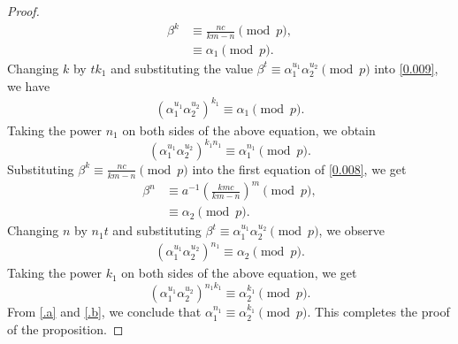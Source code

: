 \documentclass[table]{amsart}
\numberwithin{equation}{section}
\begin{document}
\begin{proof}
		\begin{align}\label{0.009}
			\beta^k &\equiv \frac{nc}{km-n}\pmod{p},\nonumber\\
			&\equiv \alpha_1 \pmod{p}.
		\end{align}
Changing $k$ by $tk_1$ and substituting the value $\beta^t \equiv \alpha_1^{u_1}\alpha_2^{u_2}\pmod {p}$ into \eqref{0.009}, we have
		\begin{align*}
			(\alpha_1^{u_1}\alpha_2^{u_2})^{k_1} \equiv \alpha_1 \pmod{p}.
		\end{align*}
		Taking the power $n_1$ on both sides of the  above equation, we obtain
		\begin{equation}\label{.a}
			(\alpha_1^{u_1}\alpha_2^{u_2})^{k_1n_1} \equiv \alpha_1^{n_1} \pmod{p}.
		\end{equation}
Substituting $\beta^k \equiv \frac{nc}{km-n}\pmod {p}$ into the first equation of \eqref{0.008}, we get
	\begin{align*}
		\beta^n & \equiv a^{-1} \left(\frac{kmc}{km-n}\right)^m \pmod{p},\\
		&\equiv \alpha_2 \pmod{p}.
	\end{align*}
Changing $n$ by $n_1t$ and substituting $\beta^t \equiv \alpha_1^{u_1}\alpha_2^{u_2} \pmod{p}$, we observe
	\begin{align*}
		(\alpha_1^{u_1}\alpha_2^{u_2})^{n_1} \equiv \alpha_2 \pmod{p}.
	\end{align*}
Taking the  power $k_1$ on both sides of the above equation, we get
		\begin{equation}\label{.b}
		(\alpha_1^{u_1}\alpha_2^{u_2})^{n_1k_1} \equiv \alpha_2^{k_1} \pmod{p}.
	\end{equation}
	From \eqref{.a} and \eqref{.b}, we conclude that $\alpha_1^{n_1} \equiv \alpha_2^{k_1} \pmod{p}$. This completes the proof of  the proposition.
\end{proof}
\end{document}
